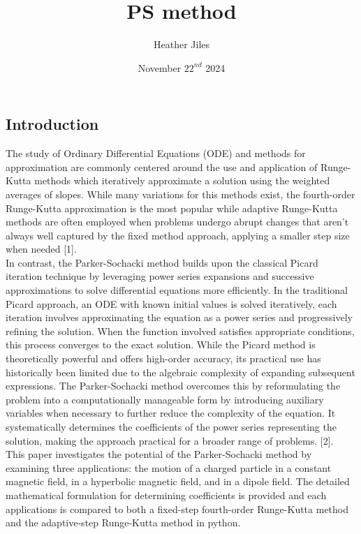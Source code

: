 \documentclass[9pt]{article}
\title{PS method}
\author{Heather Jiles}
\date{November \(22^{nd}\) 2024}
\begin{document}
\begin{multicols}{2}

\maketitle
\section{Introduction}
The study of Ordinary Differential Equations (ODE) and methods for approximation are commonly centered around the use and application of Runge-Kutta methods which iteratively approximate a solution using the weighted averages of slopes. While many variations for this methods exist, the fourth-order Runge-Kutta approximation is the most popular while adaptive Runge-Kutta methods are often employed when problems undergo abrupt changes that aren’t always well captured by the fixed method approach, applying a smaller step size when needed [1].\\

In contrast, the Parker-Sochacki method builds upon the classical Picard iteration technique by leveraging power series expansions and successive approximations to solve differential equations more efficiently. In the traditional Picard approach, an ODE with known initial values is solved iteratively, each iteration involves approximating the equation as a power series and progressively refining the solution. When the function involved satisfies appropriate conditions, this process converges to the exact solution. While the Picard method is theoretically powerful and offers high-order accuracy, its practical use has historically been limited due to the algebraic complexity of expanding subsequent expressions. The Parker-Sochacki method overcomes this by reformulating the problem into a computationally manageable form by introducing auxiliary variables when necessary to further reduce the complexity of the equation. It systematically determines the coefficients of the power series representing the solution, making the approach practical for a broader range of problems. [2].  \\

This paper investigates the potential of the Parker-Sochacki method by examining three applications: the motion of a charged particle in a constant magnetic field, in a hyperbolic magnetic field, and in a dipole field. The detailed mathematical formulation for determining coefficients is provided and each applications is compared to both a fixed-step fourth-order Runge-Kutta method and the adaptive-step Runge-Kutta method in python. \\


\end{multicols}
\end{document}
